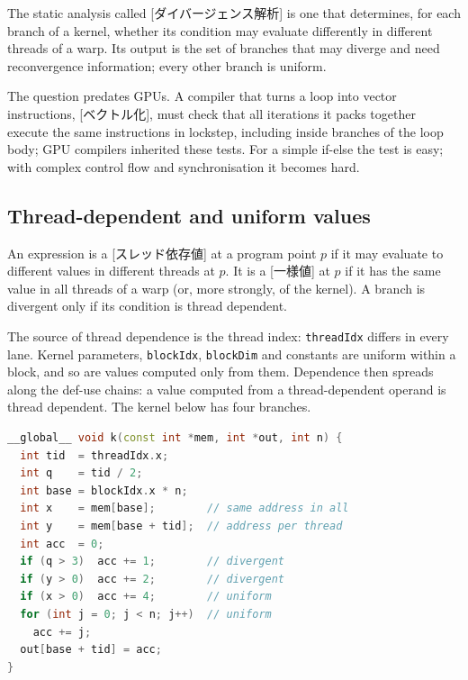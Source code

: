 \documentclass[../main.tex]{subfiles}
\begin{document}
\begin{definition}
  \label{def:l11-divergence-analysis}
  The static analysis called
  [ダイバージェンス解析] is one
  that determines, for each branch of a kernel, whether its condition
  may evaluate differently in different threads of a warp.  Its output
  is the set of branches that may diverge and need reconvergence
  information; every other branch is uniform.
\end{definition}

The question predates GPUs.  A compiler that turns a loop into vector
instructions, [ベクトル化], must check that all
iterations it packs together execute the same instructions in lockstep,
including inside branches of the loop body; GPU compilers inherited
these tests.  For a simple if-else the test is easy; with complex
control flow and synchronisation it becomes hard.

\subsection{Thread-dependent and uniform values}

\begin{definition}
  \label{def:l11-thread-dependent}
  An expression is a [スレッド依存値] at a
  program point $p$ if it may evaluate to different values in different
  threads at $p$.  It is a [一様値] at $p$ if it has
  the same value in all threads of a warp (or, more strongly, of the
  kernel).  A branch is divergent only if its condition is thread
  dependent.
\end{definition}

The source of thread dependence is the thread index: \texttt{threadIdx}
differs in every lane.  Kernel parameters, \texttt{blockIdx},
\texttt{blockDim} and constants are uniform within a block, and so are
values computed only from them.  Dependence then spreads along the
def-use chains: a value computed from a thread-dependent operand is
thread dependent.  The kernel below has four branches.

\begin{lstlisting}[language=C++, numbers=none]
__global__ void k(const int *mem, int *out, int n) {
  int tid  = threadIdx.x;
  int q    = tid / 2;
  int base = blockIdx.x * n;
  int x    = mem[base];        // same address in all
  int y    = mem[base + tid];  // address per thread
  int acc  = 0;
  if (q > 3)  acc += 1;        // divergent
  if (y > 0)  acc += 2;        // divergent
  if (x > 0)  acc += 4;        // uniform
  for (int j = 0; j < n; j++)  // uniform
    acc += j;
  out[base + tid] = acc;
}
\end{lstlisting}
\end{document}
